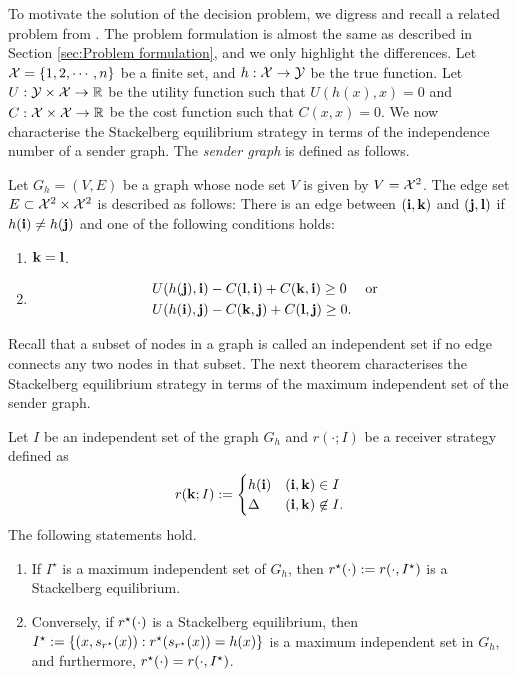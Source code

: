 To motivate the solution of the decision problem, we digress and recall a related problem from \cite{singh22strategic}. The problem formulation is almost the same as described in Section \ref{sec:Problem formulation}, and we only highlight the differences.
Let $\mathcal{X} = \{1,2,\cdots,n\}$ be a finite set, and $h:\mathcal{X} \rightarrow \mathcal{Y}$ be the true function.
Let $U: \mathcal{Y} \times \mathcal{X} \rightarrow \mathbb{R}$ be the utility function such that $U(h(x),x) = 0$ and $C: \mathcal{X} \times \mathcal{X} \rightarrow \mathbb{R}$ be the cost function such that $C(x,x) = 0$. We now characterise the Stackelberg equilibrium strategy in terms of the independence number of a sender graph.  The \textit{sender graph} is defined as follows.
\begin{defn}\label{def:Sender's graph}
	Let $G_h = (V,E)$ be a graph whose node set $V$ is given by $V = \mathcal{X}^2$. The edge set $E \subset \mathcal{X}^2 \times \mathcal{X}^2$ is described as follows: There is an edge between $(\mathbf{i},\mathbf{k})$ and $(\mathbf{j},\mathbf{l})$ if $h(\mathbf{i}) \neq h(\mathbf{j})$ and one of the following conditions holds:
	\begin{enumerate}[label=(\alph*)]
		\item $\mathbf{k} = \mathbf{l}$.
		\item \begin{equation*}
			\begin{aligned}
				&U(h(\jbb),\ibb) - C(\lbb,\ibb) + C(\kbb,\ibb) \geq 0 \text{ or}\\
				&U(h(\ibb),\jbb) - C(\kbb,\jbb) + C(\lbb,\jbb) \geq 0.
			\end{aligned}
		\end{equation*}
	\end{enumerate}
\end{defn}
Recall that a subset of nodes in a graph is called an independent set if no edge connects any two nodes in that subset. The next theorem characterises the Stackelberg equilibrium strategy in terms of the maximum independent set of the sender graph.
\begin{thm}\label{thm:Stackelberg equilibrium for discrete feature space}
	Let $I$ be an independent set of the graph $G_h$ and $r(\cdot;I)$ be a receiver strategy defined as
	\begin{equation*}
		r(\mathbf{k};I) := \begin{cases}
			h(\mathbf{i}) & (\mathbf{i},\mathbf{k}) \in I\\
			\Delta & (\mathbf{i},\mathbf{k}) \not\in I.
		\end{cases}
	\end{equation*}
	The following statements hold.
	\begin{enumerate}[label=(\alph*)]
		\item If $I^{\star}$ is a maximum independent set of $G_h$, then $r^{\star}(\cdot) := r(\cdot,I^{\star})$ is a Stackelberg equilibrium.	
		\item Conversely, if $r^{\star}(\cdot)$ is a Stackelberg equilibrium, then $I^{\star} := \{(x,s_{r^{\star}}(x)): r^{\star}(s_{r^{\star}}(x)) = h(x)\}$ is a maximum independent set in $G_h$, and furthermore, $r^{\star}(\cdot) = r(\cdot,I^{\star})$. 
	\end{enumerate}
\end{thm}

